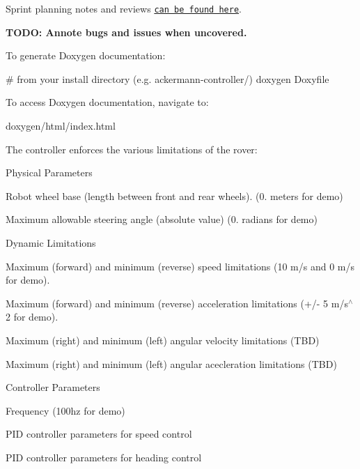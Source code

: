 Sprint planning notes and reviews \href{https://docs.google.com/document/d/1MEoRXtJXdUWnkTbJmcDfJYct3i6_LEJ-TULpP2h_qYA/edit?usp=sharing}{\tt can be found here}.

{\bfseries T\+O\+DO\+: Annote bugs and issues when uncovered.}

To generate Doxygen documentation\+:


\begin{DoxyCode}
# from your install directory (e.g. ackermann-controller/)
doxygen Doxyfile
\end{DoxyCode}


To access Doxygen documentation, navigate to\+: 
\begin{DoxyCode}
doxygen/html/index.html
\end{DoxyCode}


The controller enforces the various limitations of the rover\+:


\begin{DoxyItemize}
\item Physical Parameters
\begin{DoxyItemize}
\item Robot wheel base (length between front and rear wheels). (0. meters for demo)
\item Maximum allowable steering angle (absolute value) (0. radians for demo)
\end{DoxyItemize}
\item Dynamic Limitations
\begin{DoxyItemize}
\item Maximum (forward) and minimum (reverse) speed limitations (10 m/s and 0 m/s for demo).
\item Maximum (forward) and minimum (reverse) acceleration limitations (+/-\/ 5 m/s$^\wedge$2 for demo).
\item Maximum (right) and minimum (left) angular velocity limitations (T\+BD)
\item Maximum (right) and minimum (left) angular acecleration limitations (T\+BD)
\end{DoxyItemize}
\item Controller Parameters
\begin{DoxyItemize}
\item Frequency (100hz for demo)
\item P\+ID controller parameters for speed control
\item P\+ID controller parameters for heading control
\end{DoxyItemize}
\end{DoxyItemize}

